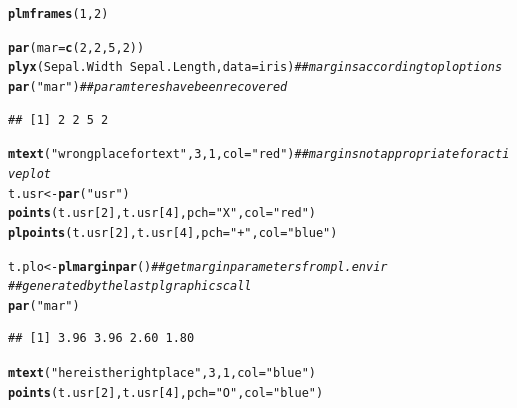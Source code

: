 \documentclass[11pt]{article}\usepackage[]{graphicx}\usepackage[]{color}
\makeatletter
\newcommand{\hlnum}[1]{\textcolor[rgb]{0.686,0.059,0.569}{#1}}%
\newcommand{\hlstr}[1]{\textcolor[rgb]{0.192,0.494,0.8}{#1}}%
\newcommand{\hlcom}[1]{\textcolor[rgb]{0.678,0.584,0.686}{\textit{#1}}}%
\newcommand{\hlopt}[1]{\textcolor[rgb]{0,0,0}{#1}}%
\newcommand{\hlstd}[1]{\textcolor[rgb]{0.345,0.345,0.345}{#1}}%
\newcommand{\hlkwb}[1]{\textcolor[rgb]{0.69,0.353,0.396}{#1}}%
\newcommand{\hlkwc}[1]{\textcolor[rgb]{0.333,0.667,0.333}{#1}}%
\newcommand{\hlkwd}[1]{\textcolor[rgb]{0.737,0.353,0.396}{\textbf{#1}}}%
\newenvironment{kframe}{%
 \def\at@end@of@kframe{}%
 \ifinner\ifhmode%
  \def\at@end@of@kframe{\end{minipage}}%
  \begin{minipage}{\columnwidth}%
 \fi\fi%
 \def\FrameCommand##1{\hskip\@totalleftmargin \hskip-\fboxsep
 \colorbox{shadecolor}{##1}\hskip-\fboxsep
     \hskip-\linewidth \hskip-\@totalleftmargin \hskip\columnwidth}%
 \MakeFramed {\advance\hsize-\width
   \@totalleftmargin\z@ \linewidth\hsize
   \@setminipage}}%
 {\par\unskip\endMakeFramed%
 \at@end@of@kframe}
\newenvironment{knitrout}{}{} %
\makeatother
\begin{document}
\begin{knitrout}
\color{fgcolor}\begin{kframe}
\begin{alltt}
\hlkwd{plmframes}\hlstd{(}\hlnum{1}\hlstd{,}\hlnum{2}\hlstd{)}

\hlkwd{par}\hlstd{(}\hlkwc{mar}\hlstd{=}\hlkwd{c}\hlstd{(}\hlnum{2}\hlstd{,}\hlnum{2}\hlstd{,}\hlnum{5}\hlstd{,}\hlnum{2}\hlstd{))}
\hlkwd{plyx}\hlstd{(Sepal.Width}\hlopt{~}\hlstd{Sepal.Length,} \hlkwc{data}\hlstd{=iris)} \hlcom{## margins according to ploptions}
\hlkwd{par}\hlstd{(}\hlstr{"mar"}\hlstd{)} \hlcom{## paramteres have been recovered}
\end{alltt}
\begin{verbatim}
## [1] 2 2 5 2
\end{verbatim}
\begin{alltt}
\hlkwd{mtext}\hlstd{(}\hlstr{"wrong place for text"}\hlstd{,}\hlnum{3}\hlstd{,}\hlnum{1}\hlstd{,} \hlkwc{col}\hlstd{=}\hlstr{"red"}\hlstd{)}  \hlcom{## margins not appropriate for active plot}
\hlstd{t.usr} \hlkwb{<-} \hlkwd{par}\hlstd{(}\hlstr{"usr"}\hlstd{)}
\hlkwd{points}\hlstd{(t.usr[}\hlnum{2}\hlstd{],t.usr[}\hlnum{4}\hlstd{],} \hlkwc{pch}\hlstd{=}\hlstr{"X"}\hlstd{,} \hlkwc{col}\hlstd{=}\hlstr{"red"}\hlstd{)}
\hlkwd{plpoints}\hlstd{(t.usr[}\hlnum{2}\hlstd{],t.usr[}\hlnum{4}\hlstd{],} \hlkwc{pch}\hlstd{=}\hlstr{"+"}\hlstd{,} \hlkwc{col}\hlstd{=}\hlstr{"blue"}\hlstd{)}

\hlstd{t.plo} \hlkwb{<-} \hlkwd{plmarginpar}\hlstd{()} \hlcom{## get margin parameters from pl.envir }
  \hlcom{## generated by the last pl graphics call}
\hlkwd{par}\hlstd{(}\hlstr{"mar"}\hlstd{)}
\end{alltt}
\begin{verbatim}
## [1] 3.96 3.96 2.60 1.80
\end{verbatim}
\begin{alltt}
\hlkwd{mtext}\hlstd{(}\hlstr{"here is the right place"}\hlstd{,}\hlnum{3}\hlstd{,}\hlnum{1}\hlstd{,} \hlkwc{col}\hlstd{=}\hlstr{"blue"}\hlstd{)}
\hlkwd{points}\hlstd{(t.usr[}\hlnum{2}\hlstd{],t.usr[}\hlnum{4}\hlstd{],} \hlkwc{pch}\hlstd{=}\hlstr{"O"}\hlstd{,} \hlkwc{col}\hlstd{=}\hlstr{"blue"}\hlstd{)}


\end{alltt}
\end{kframe}
\end{knitrout}
\end{document}
